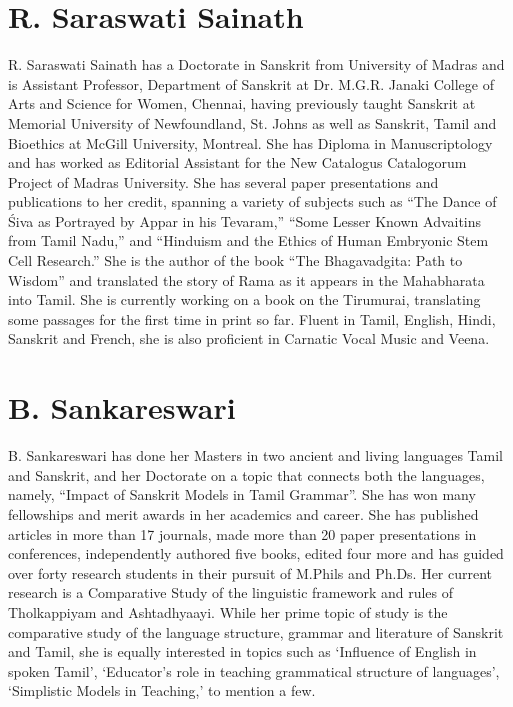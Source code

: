\section*{R. Saraswati Sainath}

R. Saraswati Sainath has a Doctorate in Sanskrit from University of Madras and is Assistant Professor, Department of Sanskrit at Dr. M.G.R. Janaki College of Arts and Science for Women, Chennai, having previously taught Sanskrit at Memorial University of Newfoundland, St. Johns as well as Sanskrit, Tamil and Bioethics at McGill University, Montreal. She has Diploma in Manuscriptology and has worked as Editorial Assistant for the New Catalogus Catalogorum Project of Madras University. She has several paper presentations and publications to her credit, spanning a variety of subjects such as “The Dance of Śiva as Portrayed by Appar in his Tevaram,” “Some Lesser Known Advaitins from Tamil Nadu,” and “Hinduism and the Ethics of Human Embryonic Stem Cell Research.” She is the author of the book “The Bhagavadgita: Path to Wisdom” and translated the story of Rama as it appears in the Mahabharata into Tamil. She is currently working on a book on the Tirumurai, translating some passages for the first time in print so far. Fluent in Tamil, English, Hindi, Sanskrit and French, she is also proficient in Carnatic Vocal Music and Veena.

\section*{B. Sankareswari}

B. Sankareswari has done her Masters in two ancient and living languages Tamil and Sanskrit, and her Doctorate on a topic that connects both the languages, namely, “Impact of Sanskrit Models in Tamil Grammar”. She has won many fellowships and merit awards in her academics and career. She has published articles in more than 17 journals, made more than 20 paper presentations in conferences, independently authored five books, edited four more and has guided over forty research students in their pursuit of M.Phils and Ph.Ds. Her current research is a Comparative Study of the linguistic framework and rules of Tholkappiyam and Ashtadhyaayi. While her prime topic of study is the comparative study of the language structure, grammar and literature of Sanskrit and Tamil, she is equally interested in topics such as ‘Influence of English in spoken Tamil’, ‘Educator’s role in teaching grammatical structure of languages’, ‘Simplistic Models in Teaching,’ to mention a few.

